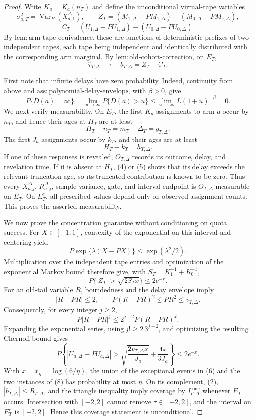 \documentclass{article}
\begin{document}
\begin{proof}
Write \(K_a=K_a(n_T)\) and define the unconditional virtual-tape variables
\[
 \sigma_{a,T}^2=\operatorname{Var}_P(X_{a,1}^{\Delta}),\qquad
 Z_T=(M_{1,\Delta}-P M_{1,\Delta})-(M_{0,\Delta}-P M_{0,\Delta}),
\]
\[
 C_T=(U_{1,\Delta}-P U_{1,\Delta})-(U_{0,\Delta}-P U_{0,\Delta}).
 \tag{1}
\]
By \(\mathrm{lem:arm\text{-}tape\text{-}equivalence}\), these are functions of deterministic prefixes of two independent tapes, each tape being independent and identically distributed with the corresponding arm marginal.  By \(\mathrm{lem:old\text{-}cohort\text{-}correction}\), on \(E_T\),
\[
 \widehat\tau_{T,\Delta}-\tau+b_{T,\Delta}=Z_T+C_T. \tag{2}
\]

First note that infinite delays have zero probability.  Indeed, continuity from above and \(\mathrm{ass:polynomial\text{-}delay\text{-}envelope}\), with \(\beta>0\), give
\[
 P\{D(a)=\infty\}=\lim_{u\to\infty}P\{D(a)>u\}
 \leq\lim_{u\to\infty}L(1+u)^{-\beta}=0. \tag{3}
\]
We next verify measurability.  On \(E_T\), the first \(K_a\) assignments to arm \(a\) occur by \(n_T\), and hence their ages at \(H_T\) are at least
\[
 H_T-n_T=m_T+\Delta_T=g_{T,\Delta}. \tag{4}
\]
The first \(J_a\) assignments occur by \(k_T\), and their ages are at least
\[
 H_T-k_T=h_{T,\Delta}. \tag{5}
\]
If one of these responses is revealed, \(O_{T,\Delta}\) records its outcome, delay, and revelation time.  If it is absent at \(H_T\), (4) or (5) shows that its delay exceeds the relevant truncation age, so its truncated contribution is known to be zero.  Thus every \(X_{a,j}^{\Delta}\), \(R_{a,j}^{\Delta}\), sample variance, gate, and interval endpoint is \(O_{T,\Delta}\)-measurable on \(E_T\).  On \(E_T^c\), all prescribed values depend only on observed assignment counts.  This proves the asserted measurability.

We now prove the concentration guarantee without conditioning on quota success.  For \(X\in[-1,1]\), convexity of the exponential on this interval and centering yield
\[
 P\exp\{\lambda(X-PX)\}\leq \exp(\lambda^2/2).
\]
Multiplication over the independent tape entries and optimization of the exponential Markov bound therefore give, with \(S_T=K_1^{-1}+K_0^{-1}\),
\[
 P\{|Z_T|>\sqrt{2S_Tx}\}\leq2e^{-x}. \tag{6}
\]
For an old-tail variable \(R\), boundedness and the delay envelope imply
\[
 |R-PR|\leq2,\qquad P(R-PR)^2\leq PR^2\leq v_{T,\Delta}. \tag{7}
\]
Consequently, for every integer \(j\geq2\),
\[
 P|R-PR|^j\leq2^{j-2}P(R-PR)^2.
\]
Expanding the exponential series, using \(j!\geq2\,3^{j-2}\), and optimizing the resulting Chernoff bound gives
\[
 P\left\{|U_{a,\Delta}-PU_{a,\Delta}|>
 \sqrt{\frac{2v_{T,\Delta}x}{J_a}}+\frac{4x}{3J_a}\right\}
 \leq2e^{-x}. \tag{8}
\]
With \(x=x_\eta=\log(6/\eta)\), the union of the exceptional events in (6) and the two instances of (8) has probability at most \(\eta\).  On its complement, (2), \(|b_{T,\Delta}|\leq B_{T,\Delta}\), and the triangle inequality imply coverage by \(I_{T,\Delta}^{\mathrm{conc}}\) whenever \(E_T\) occurs.  Intersection with \([-2,2]\) cannot remove \(\tau\in[-2,2]\), and the interval on \(E_T^c\) is \([-2,2]\).  Hence this coverage statement is unconditional.


\end{proof}
\end{document}
